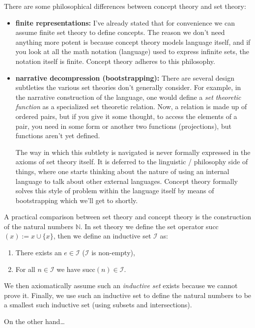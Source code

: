 \documentclass[twoside]{article}
\begin{document}
There are some philosophical differences between concept theory and set theory:
\begin{itemize}
\item {\bfseries finite representations:} I've already stated that for convenience we can assume finite set theory to define
concepts. The reason we don't need anything more potent is because concept theory models language itself, and if you look at
all the math notation (language) used to express infinite sets, the notation itself is finite. Concept theory adheres to
this philosophy.
\item {\bfseries narrative decompression (bootstrapping):} There are several design subtleties the various set theories
don't generally consider. For example, in the narrative construction of the language, one would define a
\emph{set theoretic function} as a specialized set theoretic relation. Now, a relation is made up of ordered pairs,
but if you give it some thought, to access the elements of a pair, you need in some form or another two functions
(projections), but functions aren't yet defined.

The way in which this subtlety is navigated is never formally expressed in the axioms of set theory itself. It is deferred
to the linguistic / philosophy side of things, where one starts thinking about the nature of using an internal language to
talk about other external languages. Concept theory formally solves this style of problem within the language itself
by means of bootstrapping which we'll get to shortly.
\end{itemize}

A practical comparison between set theory and concept theory is the construction of the natural numbers $ \mathbb{N} $.
In set theory we define the set operator succ$ (x) := x \cup \{x\} $, then we define an inductive set $ \mathcal{I} $ as:
\begin{enumerate}
\item There exists an $ e \in \mathcal{I} $ ($ \mathcal{I} $ is non-empty),
\item For all $ n \in \mathcal{I} $ we have succ$ (n) \in \mathcal{I} $.
\end{enumerate}
We then axiomatically assume such an \emph{inductive set} exists because we cannot prove it. Finally, we use such an
inductive set to define the natural numbers to be a smallest such inductive set (using subsets and intersections).

On the other hand\ldots

\newpage
\end{document}
